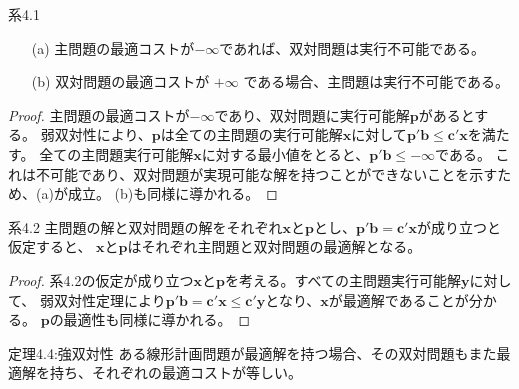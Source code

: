 \documentclass{jsarticle}
\begin{document}
\begin{itembox}[l]{系4.1}
  \begin{itemize}
    \item[(a)] 主問題の最適コストが$-\infty$であれば、双対問題は実行不可能である。
    \item[(b)] 双対問題の最適コストが $+\infty$ である場合、主問題は実行不可能である。
  \end{itemize}
\end{itembox}

\begin{proof}
  主問題の最適コストが$-\infty$であり、双対問題に実行可能解$\bm{p}$があるとする。
  弱双対性により、$\bm{p}$は全ての主問題の実行可能解$\bm{x}$に対して$\bm{p}'\bm{b}\leq \bm{c}'\bm{x}$を満たす。
  全ての主問題実行可能解$\bm{x}$に対する最小値をとると、$\bm{p}'\bm{b}\leq -\infty$である。
  これは不可能であり、双対問題が実現可能な解を持つことができないことを示すため、(a)が成立。
  (b)も同様に導かれる。
\end{proof}

\begin{itembox}[l]{系4.2}
  主問題の解と双対問題の解をそれぞれ$\bm{x}$と$\bm{p}$とし、$\bm{p}'\bm{b} = \bm{c}'\bm{x}$が成り立つと仮定すると、
  $\bm{x}$と$\bm{p}$はそれぞれ主問題と双対問題の最適解となる。
\end{itembox}

\begin{proof}
  系4.2の仮定が成り立つ$\bm{x}$と$\bm{p}$を考える。すべての主問題実行可能解$\bm{y}$に対して、
  弱双対性定理により$\bm{p}'\bm{b}=\bm{c}'\bm{x}\leq \bm{c}'\bm{y}$となり、$\bm{x}$が最適解であることが分かる。
  $\bm{p}$の最適性も同様に導かれる。
\end{proof}

\newpage

\begin{itembox}[l]{定理4.4:強双対性}
  ある線形計画問題が最適解を持つ場合、その双対問題もまた最適解を持ち、それぞれの最適コストが等しい。
\end{itembox}
\end{document}
